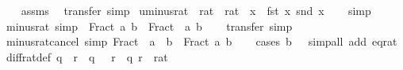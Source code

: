 \begin{isabellebody}
%
\isadelimproof
\ \ %
\endisadelimproof
%
\isatagproof
{}\isamarkupfalse%
\ assms\ \isamarkupfalse%
\ transfer\ simp%
\endisatagproof
{\isafoldproof}%
%
\isadelimproof
\isanewline
%
\endisadelimproof
\isanewline
{}\isamarkupfalse%
\ uminus{\isacharunderscore}{\kern0pt}rat\ {\isacharcolon}{\kern0pt}{\isacharcolon}{\kern0pt}\ {\isachardoublequoteopen}rat\ {\isasymRightarrow}\ rat{\isachardoublequoteclose}\ \ {\isachardoublequoteopen}{\isasymlambda}x{\isachardot}{\kern0pt}\ {\isacharparenleft}{\kern0pt}{\isacharminus}{\kern0pt}\ fst\ x{\isacharcomma}{\kern0pt}\ snd\ x{\isacharparenright}{\kern0pt}{\isachardoublequoteclose}\isanewline
%
\isadelimproof
\ \ %
\endisadelimproof
%
\isatagproof
{}\isamarkupfalse%
\ simp%
\endisatagproof
{\isafoldproof}%
%
\isadelimproof
\isanewline
%
\endisadelimproof
\isanewline
{}\isamarkupfalse%
\ minus{\isacharunderscore}{\kern0pt}rat\ {\isacharbrackleft}{\kern0pt}simp{\isacharbrackright}{\kern0pt}{\isacharcolon}{\kern0pt}\ {\isachardoublequoteopen}{\isacharminus}{\kern0pt}\ Fract\ a\ b\ {\isacharequal}{\kern0pt}\ Fract\ {\isacharparenleft}{\kern0pt}{\isacharminus}{\kern0pt}\ a{\isacharparenright}{\kern0pt}\ b{\isachardoublequoteclose}\isanewline
%
\isadelimproof
\ \ %
\endisadelimproof
%
\isatagproof
{}\isamarkupfalse%
\ transfer\ simp%
\endisatagproof
{\isafoldproof}%
%
\isadelimproof
\isanewline
%
\endisadelimproof
\isanewline
{}\isamarkupfalse%
\ minus{\isacharunderscore}{\kern0pt}rat{\isacharunderscore}{\kern0pt}cancel\ {\isacharbrackleft}{\kern0pt}simp{\isacharbrackright}{\kern0pt}{\isacharcolon}{\kern0pt}\ {\isachardoublequoteopen}Fract\ {\isacharparenleft}{\kern0pt}{\isacharminus}{\kern0pt}\ a{\isacharparenright}{\kern0pt}\ {\isacharparenleft}{\kern0pt}{\isacharminus}{\kern0pt}\ b{\isacharparenright}{\kern0pt}\ {\isacharequal}{\kern0pt}\ Fract\ a\ b{\isachardoublequoteclose}\isanewline
%
\isadelimproof
\ \ %
\endisadelimproof
%
\isatagproof
{}\isamarkupfalse%
\ {\isacharparenleft}{\kern0pt}cases\ {\isachardoublequoteopen}b\ {\isacharequal}{\kern0pt}\ {}{\isachardoublequoteclose}{\isacharparenright}{\kern0pt}\ {\isacharparenleft}{\kern0pt}simp{\isacharunderscore}{\kern0pt}all\ add{\isacharcolon}{\kern0pt}\ eq{\isacharunderscore}{\kern0pt}rat{\isacharparenright}{\kern0pt}%
\endisatagproof
{\isafoldproof}%
%
\isadelimproof
\isanewline
%
\endisadelimproof
\isanewline
{}\isamarkupfalse%
\ diff{\isacharunderscore}{\kern0pt}rat{\isacharunderscore}{\kern0pt}def{\isacharcolon}{\kern0pt}\ {\isachardoublequoteopen}q\ {\isacharminus}{\kern0pt}\ r\ {\isacharequal}{\kern0pt}\ q\ {\isacharplus}{\kern0pt}\ {\isacharminus}{\kern0pt}\ r{\isachardoublequoteclose}\ \ q\ r\ {\isacharcolon}{\kern0pt}{\isacharcolon}{\kern0pt}\ rat\isanewline

\end{isabellebody}

